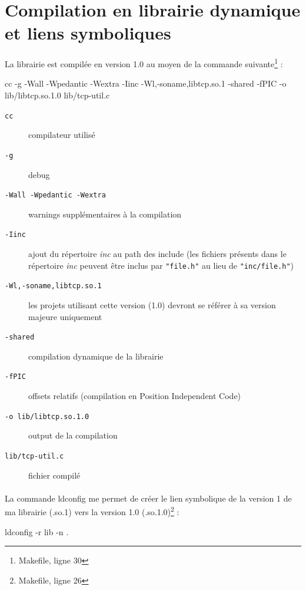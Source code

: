 \documentclass{article}
\begin{document}
    \section{Compilation en librairie dynamique et liens symboliques}
    \paragraph{}
    La librairie est compilée en version 1.0 au moyen de la commande suivante\footnote{Makefile, ligne 30} :
    \begin{verbatimtab}
        cc -g -Wall -Wpedantic -Wextra -Iinc -Wl,-soname,libtcp.so.1
            -shared -fPIC -o lib/libtcp.so.1.0 lib/tcp-util.c
    \end{verbatimtab}

    \begin{description}
        \item[\texttt{cc}] compilateur utilisé
        \item[\texttt{-g}] debug
        \item[\texttt{-Wall -Wpedantic -Wextra}] warnings supplémentaires à la compilation
        \item[\texttt{-Iinc}] ajout du répertoire \emph{inc} au path des include (les fichiers présents dans le répertoire \emph{inc} peuvent être inclus par \texttt{"file.h"} au lieu de \texttt{"inc/file.h"})
        \item[\texttt{-Wl,-soname,libtcp.so.1}] les projets utilisant cette version (1.0) devront se référer à sa version majeure uniquement
        \item[\texttt{-shared}] compilation dynamique de la librairie
        \item[\texttt{-fPIC}] offsets relatifs (compilation en Position Independent Code)
        \item[\texttt{-o lib/libtcp.so.1.0}] output de la compilation
        \item[\texttt{lib/tcp-util.c}] fichier compilé
    \end{description}

    \newpage
    \paragraph{}
    La commande ldconfig me permet de créer le lien symbolique de la version 1 de ma librairie (.so.1) vers la version 1.0 (.so.1.0)\footnote{Makefile, ligne 26} :
    \begin{verbatimtab}
        ldconfig -r lib -n .
    \end{verbatimtab}
\end{document}
